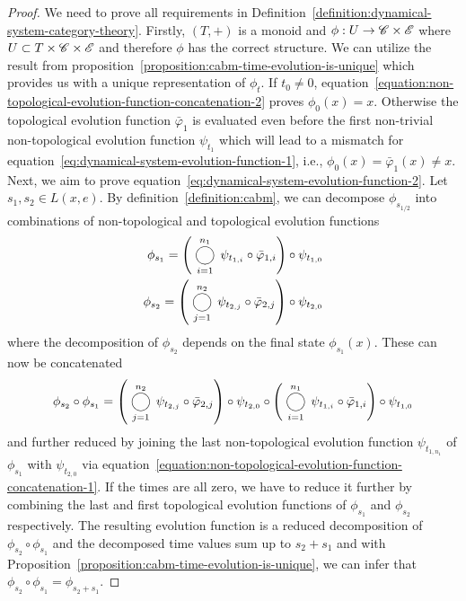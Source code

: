 \begin{proof}
    We need to prove all requirements in
    Definition~\ref{definition:dynamical-system-category-theory}.
    Firstly, $(T,+)$ is a monoid and $\phi:U\rightarrow \mathscr{C}\times\mathscr{E}$ where
    $U\subset T\times\mathscr{C}\times\mathscr{E}$ and therefore $\phi$ has the correct structure.
    We can utilize the result from proposition~\ref{proposition:cabm-time-evolution-is-unique} which
    provides us with a unique representation of $\phi_t$.
    If $t_0\neq0$, equation~\eqref{equation:non-topological-evolution-function-concatenation-2}
    proves $\phi_0(x)=x$.
    Otherwise the topological evolution function $\bar{\varphi}_1$ is evaluated even before the
    first non-trivial non-topological evolution function $\psi_{t_1}$ which will lead to a mismatch
    for equation~\eqref{eq:dynamical-system-evolution-function-1}, i.e.,
    $\phi_0(x)=\bar{\varphi}_1(x)\neq x$.
    Next, we aim to prove equation~\eqref{eq:dynamical-system-evolution-function-2}.
    Let $s_1,s_2\in L(x,e)$.
    By definition~\ref{definition:cabm}, we can decompose $\phi_{s_{1/2}}$ into combinations of
    non-topological and topological evolution functions
    \begin{align}
        \phi_{s_1} = \left(\bigcomp\limits_{i=1}^{n_1}\psi_{t_{1,i}}\circ\bar{\varphi}_{1,i}\right)\circ\psi_{t_{1,0}}\\
        \phi_{s_2} = \left(\bigcomp\limits_{j=1}^{n_2}\psi_{t_{2,j}}\circ\bar{\varphi}_{2,j}\right)\circ\psi_{t_{2,0}}
    \end{align}
    where the decomposition of $\phi_{s_2}$ depends on the final state $\phi_{s_1}(x)$.
    These can now be concatenated
    \begin{equation}
        \phi_{s_2}\circ\phi_{s_1} =
            \left(\bigcomp_{j=1}^{n_2}\psi_{t_{2,j}}\circ\bar{\varphi}_{2,j}\right)\circ\psi_{t_{2,0}}
            \circ
            \left(\bigcomp_{i=1}^{n_1}\psi_{t_{1,i}}\circ\bar{\varphi}_{1,i}\right)\circ\psi_{t_{1,0}}\\
    \end{equation}
    and further reduced by joining the last non-topological evolution function $\psi_{t_{1,n_1}}$ of
    $\phi_{s_1}$ with $\psi_{t_{2,0}}$ via
    equation~\eqref{equation:non-topological-evolution-function-concatenation-1}.
    If the times are all zero, we have to reduce it further by combining the last and first
    topological evolution functions of $\phi_{s_1}$ and $\phi_{s_2}$ respectively.
    The resulting evolution function is a reduced decomposition of $\phi_{s_2}\circ\phi_{s_1}$ and
    the decomposed time values sum up to $s_2+s_1$ and with
    Proposition~\ref{proposition:cabm-time-evolution-is-unique}, we can infer that
    $\phi_{s_2}\circ\phi_{s_1}=\phi_{s_2+s_1}$.
\end{proof}

